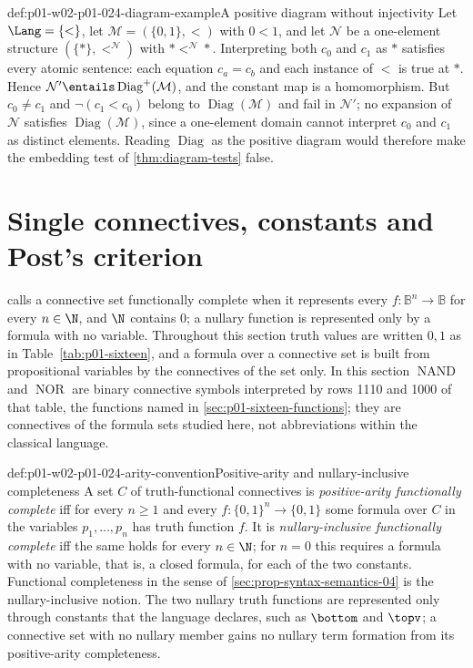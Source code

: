 \begin{hbexample}{def:p01-w02-p01-024-diagram-example}{A positive diagram without injectivity}
Let \(\Lang=\{<\}\), let \(\mathcal M=(\{0,1\},<)\) with \(0<1\), and let
\(\mathcal N\) be a one-element structure \((\{\ast\},<^{\mathcal N})\)
with \(\ast<^{\mathcal N}\ast\).  Interpreting both \(c_0\) and \(c_1\) as
\(\ast\) satisfies every atomic sentence: each equation \(c_a=c_b\) and each
instance of \(<\) is true at \(\ast\).  Hence
\(\mathcal N'\entails\operatorname{Diag}^+(\mathcal M)\), and the constant
map is a homomorphism.  But \(c_0\neq c_1\) and \(\neg(c_1<c_0)\) belong to
\(\operatorname{Diag}(\mathcal M)\) and fail in \(\mathcal N'\); no
expansion of \(\mathcal N\) satisfies \(\operatorname{Diag}(\mathcal M)\),
since a one-element domain cannot interpret \(c_0\) and \(c_1\) as distinct
elements.  Reading \(\operatorname{Diag}\) as the positive diagram would
therefore make the embedding test of \cref{thm:diagram-tests} false.
\end{hbexample}

\section{Single connectives, constants and Post's criterion}
\label{sec:p01-w02-p01-024-post}

 calls a connective set functionally
complete when it represents every \(f:\mathbb B^n\to\mathbb B\) for every
\(n\in\N\), and \(\N\) contains \(0\); a nullary function is represented
only by a formula with no variable.  Throughout this section truth values are written \(0,1\) as in
Table~\ref{tab:p01-sixteen}, and a formula over a connective set is built
from propositional variables by the connectives of the set only.  In this
section \(\operatorname{NAND}\) and \(\operatorname{NOR}\) are binary
connective symbols interpreted by rows 1110 and 1000 of that table, the
functions named in \cref{sec:p01-sixteen-functions}; they are connectives of
the formula sets studied here, not abbreviations within the classical
language.

\begin{hbconvention}{def:p01-w02-p01-024-arity-convention}{Positive-arity and nullary-inclusive completeness}
A set \(C\) of truth-functional connectives is \emph{positive-arity
functionally complete} iff for every \(n\geq1\) and every
\(f:\{0,1\}^n\to\{0,1\}\) some formula over \(C\) in the variables
\(p_1,\ldots,p_n\) has truth function \(f\).  It is
\emph{nullary-inclusive functionally complete} iff the same holds for every
\(n\in\N\); for \(n=0\) this requires a formula with no variable, that is,
a closed formula, for each of the two constants.  Functional completeness
in the sense of \cref{sec:prop-syntax-semantics-04} is the
nullary-inclusive notion.  The two nullary truth functions are represented
only through constants that the language declares, such as
\(\bottom\) and \(\topv\); a connective set with no nullary member gains no
nullary term formation from its positive-arity completeness.
\end{hbconvention}

